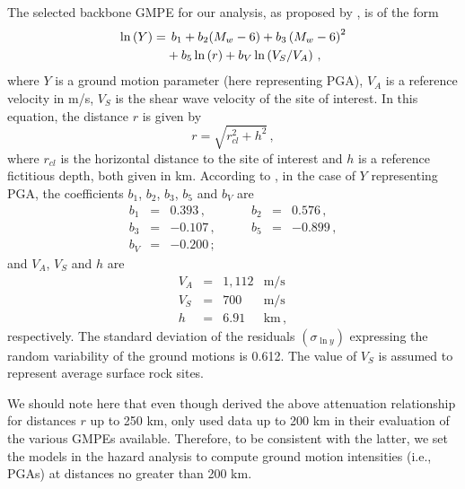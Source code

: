 The selected backbone GMPE for our analysis, as proposed by \citet{Kalkan2004}, is of the form
%
\begin{align}
	\ln \left( Y \right) =
		& \hspace{1ex} b_1 + b_2(M_w - 6) + b_3 \left( M_w - 6 \right)^{2} \nonumber \\
		& + b_5 \ln \left( r \right) + b_V \ln \left( V_S / V_A \right)
	\, ,
\end{align}
%
where $Y$ is a ground motion parameter (here representing PGA), $V_A$ is a reference velocity in m/s,  $V_S$ is the shear wave velocity of the site of interest. In this equation, the distance $r$ is given by
%
\begin{equation}
	r= \sqrt{ r^2_{\mathit{cl}} + h^2 }
	\, ,
\end{equation}
%
where $r_{\mathit{cl}}$ is the horizontal distance to the site of interest and $h$ is a reference fictitious depth, both given in km. According to \citet{Kalkan2004}, in the case of $Y$ representing PGA, the coefficients $b_1$, $b_2$, $b_3$, $b_5$ and $b_V$ are
%
\begin{equation}
\begin{array}{lcrlcr}
	b_1 &=&  0.393   \,,&\hspace{2em}   b_2 &=& 0.576\,,   \\
	b_3 &=& -0.107   \,,&\hspace{2em}   b_5 &=& -0.899\,,  \\
	b_V &=& -0.200   \,;
	\nonumber
\end{array}
\end{equation}
%
and $V_A$, $V_S$ and $h$ are
%
\begin{equation}
\begin{array}{lcrl}
	V_A &=& 1,112 & \mathrm{m/s}	\\
	V_S &=&   700 & \mathrm{m/s}	\\
	h   &=&  6.91 & \mathrm{km}\,,
	\nonumber
\end{array}
\end{equation}
%
respectively. The standard deviation of the residuals $(\sigma_{\ln y})$ expressing the random variability of the ground motions is 0.612. The value of $V_S$ is assumed to represent average surface rock sites.

We should note here that even though \citet{Kalkan2004} derived the above attenuation relationship for distances $r$ up to 250 km, \citet{Zafarani2014} only used data up to 200 km in their evaluation of the various GMPEs available. Therefore, to be consistent with the latter, we set the models in the hazard analysis to compute ground motion intensities (i.e., PGAs) at distances no greater than 200 km.
